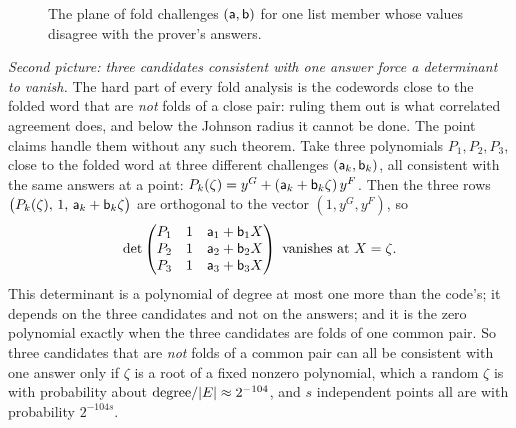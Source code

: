 \begin{figure}[t]
\centering
{}
\caption{The plane of fold challenges $(\mathsf{a},\mathsf{b})$ for one list member whose values disagree with the prover's answers.}\label{fig:lines}
\end{figure}

\emph{Second picture: three candidates consistent with one answer force a determinant to vanish.} The hard part of every fold analysis is the codewords close to the folded word that are \emph{not} folds of a close pair: ruling them out is what correlated agreement does, and below the Johnson radius it cannot be done. The point claims handle them without any such theorem. Take three polynomials $P_1,P_2,P_3$, close to the folded word at three different challenges $(\mathsf{a}_k,\mathsf{b}_k)$, all consistent with the same answers at a point: $P_k(\zeta)=y^G+(\mathsf{a}_k+\mathsf{b}_k\zeta)\,y^F$. Then the three rows $\bigl(P_k(\zeta),\,1,\,\mathsf{a}_k+\mathsf{b}_k\zeta\bigr)$ are orthogonal to the vector $(1,y^G,y^F)$, so
\[
\det\begin{pmatrix}P_1&1&\afa_1+\afb_1X\\P_2&1&\afa_2+\afb_2X\\P_3&1&\afa_3+\afb_3X\end{pmatrix}\ \text{vanishes at }X=\zeta .
\]
This determinant is a polynomial of degree at most one more than the code's; it depends on the three candidates and not on the answers; and it is the zero polynomial exactly when the three candidates are folds of one common pair. So three candidates that are \emph{not} folds of a common pair can all be consistent with one answer only if $\zeta$ is a root of a fixed nonzero polynomial, which a random $\zeta$ is with probability about $\text{degree}/|E|\approx2^{-104}$, and $s$ independent points all are with probability $2^{-104s}$.

